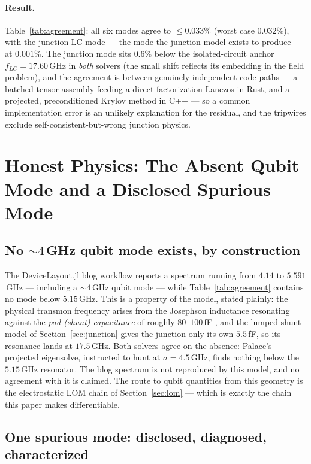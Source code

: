 \documentclass{anvil-paper}
\begin{document}
\paragraph{Result.}
Table~\ref{tab:agreement}: all six modes agree to $\leq 0.033\%$ (worst
case $0.032\%$), with the junction LC mode --- the mode the junction
model exists to produce --- at $0.001\%$. The junction mode sits $0.6\%$
below the isolated-circuit anchor $f_{LC} = 17.60$\,GHz in \emph{both}
solvers (the small shift reflects its embedding in the field problem),
and the agreement is between genuinely independent code paths --- a
batched-tensor assembly feeding a direct-factorization Lanczos in Rust,
and a projected, preconditioned Krylov method in C++ --- so a common
implementation error is an unlikely explanation for the residual, and
the tripwires exclude self-consistent-but-wrong junction physics.

\section{Honest Physics: The Absent Qubit Mode and a Disclosed Spurious
Mode}
\label{sec:honest-physics}

\subsection{No \texorpdfstring{${\sim}4$\,GHz}{\textasciitilde 4 GHz} qubit mode exists, by construction}
\label{sec:absent-mode}

The DeviceLayout.jl blog workflow \citep{devicelayout-blog} reports a
spectrum running from $4.14$ to $5.591$\,GHz --- including a
${\sim}4$\,GHz qubit mode --- while Table~\ref{tab:agreement} contains
no mode below $5.15$\,GHz. This is a property of the model, stated plainly: the
physical transmon frequency arises from the Josephson inductance
resonating against the \emph{pad (shunt) capacitance} of roughly
$80$--$100$\,fF \citep{koch2007}, and the lumped-shunt model of
Section~\ref{sec:junction} gives the junction only its own $5.5$\,fF, so
its resonance lands at $17.5$\,GHz. Both solvers agree on the absence:
Palace's projected eigensolve, instructed to hunt at $\sigma =
4.5$\,GHz, finds nothing below the $5.15$\,GHz resonator. The blog
spectrum is not reproduced by this model, and no agreement with it is
claimed. The route to qubit quantities from this geometry is the
electrostatic LOM chain of Section~\ref{sec:lom} --- which is exactly the
chain this paper makes differentiable.

\subsection{One spurious mode: disclosed, diagnosed, characterized}
\label{sec:spurious-mode}
\end{document}
